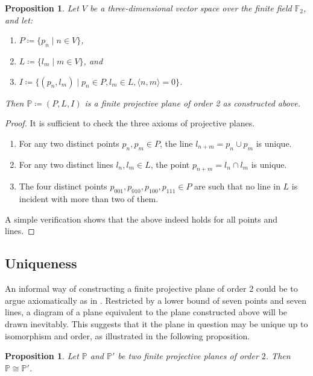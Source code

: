 \documentclass{report}
\newcommand{\F}{\mathbb{F}}
\renewcommand{\P}{\mathbb{P}}
\newtheorem{proposition}[theorem]{Proposition}
\theoremstyle{definition}\newtheorem*{definition}{Definition}
\theoremstyle{definition}\newtheorem*{example}{Example}
\theoremstyle{remark}\newtheorem*{remark}{Remark}
\begin{document}
\begin{proposition}
\label{prop:order2}
Let $ V $ be a three-dimensional vector space over the finite field $ \F_2 $, and let:
\begin{enumerate}
  \item $ P \coloneqq \{ p_n \mid n \in V \} $,
  \item $ L \coloneqq \{ l_m \mid m \in V \} $, and
  \item $ I \coloneqq \{ (p_n, l_m) \mid p_n \in P, l_m \in L, \langle n, m \rangle = 0 \} $.
\end{enumerate}
Then $ \P \coloneqq (P, L, I) $ is a finite projective plane of order 2 as constructed above.
\end{proposition}

\begin{proof}
It is sufficient to check the three axioms of projective planes.
\begin{enumerate}
  \item For any two distinct points $ p_n, p_m \in P $, the line $ l_{n + m} = p_n \cup p_m $ is unique.
  \item For any two distinct lines $ l_n, l_m \in L $, the point $ p_{n + m} = l_n \cap l_m $ is unique.
  \item The four distinct points $ p_{001}, p_{010}, p_{100}, p_{111} \in P $ are such that no line in $ L $ is incident with more than two of them.
\end{enumerate}
A simple verification shows that the above indeed holds for all points and lines.
\end{proof}

\subsection{Uniqueness}

An informal way of constructing a finite projective plane of order 2 could be to argue axiomatically as in \cite{geombook}. Restricted by a lower bound of seven points and seven lines, a diagram of a plane equivalent to the plane constructed above will be drawn inevitably. This suggests that it the plane in question may be unique up to isomorphism and order, as illustrated in the following proposition.

\begin{proposition}
Let $ \P $ and $ \P' $ be two finite projective planes of order $ 2 $. Then $ \P \cong \P' $.
\end{proposition}
\end{document}
